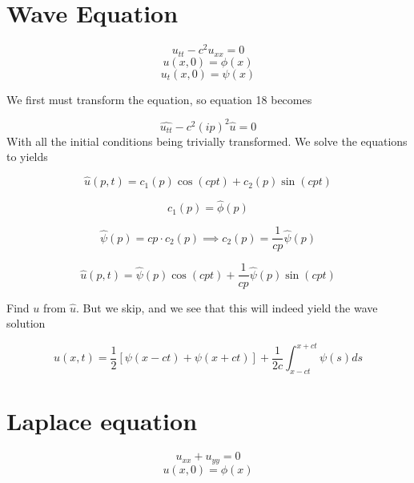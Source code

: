 \documentclass{article}
\newtheorem{one minute paper}[theorem]{One Minute Paper}
\begin{document}
\section*{Wave Equation}

\begin{equation}
    u_{tt} - c^2u_{xx} = 0
\end{equation}
\begin{equation}
    u(x,0) = \phi(x)
\end{equation}
\begin{equation}
    u_t(x,0) = \psi(x)
\end{equation}

We first must transform the equation, so equation 18 becomes

\begin{equation}
    \widehat{u_{tt}} - c^2(ip)^2\widehat{u} = 0
\end{equation}
With all the initial conditions being trivially transformed. We solve the equations to yields

\begin{equation}
    \widehat{u}(p,t) = c_1(p)\cos(cpt) + c_2(p)\sin(cpt)
\end{equation}

\begin{equation}
    c_1(p) = \widehat{\phi}(p)
\end{equation}

\begin{equation}
    \widehat{\psi}(p) = cp \cdot c_2(p) \implies c_2(p) = \frac{1}{cp}\widehat{\psi}(p)
\end{equation}

\begin{equation}
    \widehat{u}(p,t) = \widehat{\psi}(p)\cos(cpt) + \frac{1}{cp}\widehat{\psi}(p)\sin(cpt)
\end{equation}

Find $u$ from $\widehat{u}$. But we skip, and we see that this will indeed yield the wave solution

\begin{equation}
    u(x,t) = \frac{1}{2}[\psi(x-ct) + \psi(x + ct)] + \frac{1}{2c}\int_{x - ct}^{x + ct}\psi(s)ds
\end{equation}

\section*{Laplace equation}

\begin{equation}
    u_{xx} + u_{yy} = 0
\end{equation}
\begin{equation}
    u(x,0) = \phi(x)
\end{equation}
\end{document}
